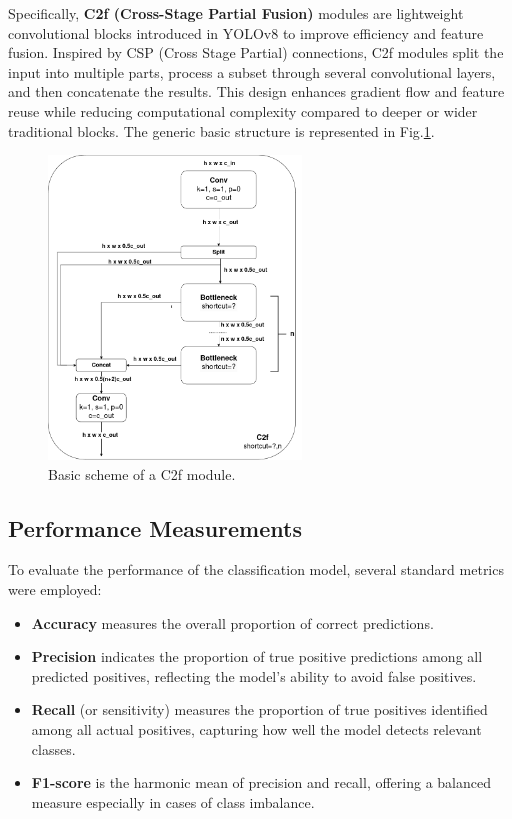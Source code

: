 \documentclass[a4paper,12pt]{article}
\begin{document}
Specifically, \textbf{C2f (Cross-Stage Partial Fusion)} modules are lightweight convolutional blocks introduced in YOLOv8 to improve efficiency and feature fusion. Inspired by CSP (Cross Stage Partial) connections, C2f modules split the input into multiple parts, process a subset through several convolutional layers, and then concatenate the results. This design enhances gradient flow and feature reuse while reducing computational complexity compared to deeper or wider traditional blocks.
The generic basic structure is represented in Fig.\ref{fig:c2f_module}.

\begin{figure}[h]
	\centering
	\includegraphics[width=0.60\textwidth]{yolov8-cf2.png}
	\caption{Basic scheme of a C2f module.}
	\label{fig:c2f_module}
\end{figure}



\subsection{Performance Measurements}

To evaluate the performance of the classification model, several standard metrics were employed:

\begin{itemize}
	\item \textbf{Accuracy} measures the overall proportion of correct predictions.
	\item \textbf{Precision} indicates the proportion of true positive predictions among all predicted positives, reflecting the model's ability to avoid false positives.
	\item \textbf{Recall} (or sensitivity) measures the proportion of true positives identified among all actual positives, capturing how well the model detects relevant classes.
	\item \textbf{F1-score} is the harmonic mean of precision and recall, offering a balanced measure especially in cases of class imbalance.
\end{itemize}
\end{document}
